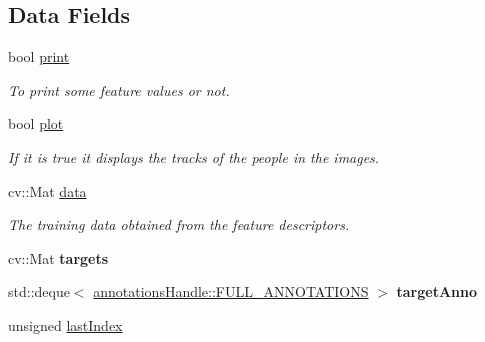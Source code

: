 \subsection*{Data Fields}
\begin{DoxyCompactItemize}
\item 
\hypertarget{classpeopleDetector_a3ad3a4240c0f97c7e85aff5c52a454d4}{
bool \hyperlink{classpeopleDetector_a3ad3a4240c0f97c7e85aff5c52a454d4}{print}}
\label{classpeopleDetector_a3ad3a4240c0f97c7e85aff5c52a454d4}

\begin{DoxyCompactList}\small\item\em To print some feature values or not. \item\end{DoxyCompactList}\item 
\hypertarget{classpeopleDetector_ac7c64a841942f6721d4a3694dd4ef18c}{
bool \hyperlink{classpeopleDetector_ac7c64a841942f6721d4a3694dd4ef18c}{plot}}
\label{classpeopleDetector_ac7c64a841942f6721d4a3694dd4ef18c}

\begin{DoxyCompactList}\small\item\em If it is true it displays the tracks of the people in the images. \item\end{DoxyCompactList}\item 
cv::Mat \hyperlink{classpeopleDetector_a511ae0b1c13f95e5f08f1a0dd3da3d93}{data}
\begin{DoxyCompactList}\small\item\em The training data obtained from the feature descriptors. \item\end{DoxyCompactList}\item 
\hypertarget{classpeopleDetector_a66b39000d7ffa25b3eb9a21e28faf658}{
cv::Mat {\bfseries targets}}
\label{classpeopleDetector_a66b39000d7ffa25b3eb9a21e28faf658}

\item 
\hypertarget{classpeopleDetector_a6306f78f8ec781a814a99ab3a4c1b902}{
std::deque$<$ \hyperlink{structannotationsHandle_1_1FULL__ANNOTATIONS}{annotationsHandle::FULL\_\-ANNOTATIONS} $>$ {\bfseries targetAnno}}
\label{classpeopleDetector_a6306f78f8ec781a814a99ab3a4c1b902}

\item 
\hypertarget{classpeopleDetector_a104c590b4dd4ecb421cedcc0324b5579}{
unsigned \hyperlink{classpeopleDetector_a104c590b4dd4ecb421cedcc0324b5579}{lastIndex}}
\label{classpeopleDetector_a104c590b4dd4ecb421cedcc0324b5579}


\end{DoxyCompactItemize}
